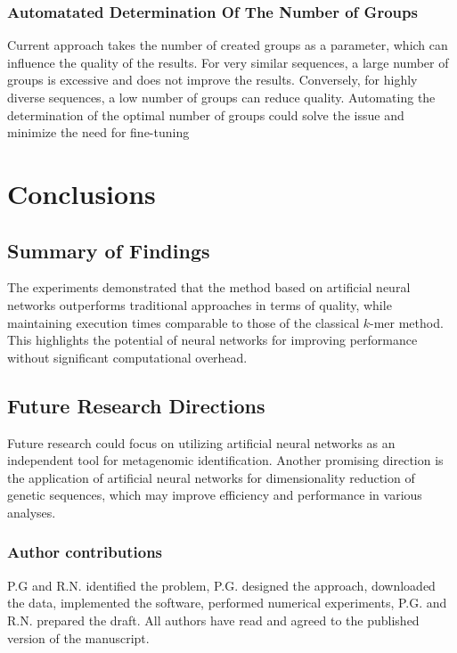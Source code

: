 \documentclass[pdflatex,sn-vancouver-num]{sn-jnl}%
\begin{document}
            \subsubsection{Automatated Determination Of The Number of Groups}
                Current approach takes the number of created groups as a parameter, which can influence the quality of the results. For very similar sequences, a large number of groups is excessive and does not improve the results. Conversely, for highly diverse sequences, a low number of groups can reduce quality. Automating the determination of the optimal number of groups could solve the issue and minimize the need for fine-tuning 

    \section{Conclusions}
        \subsection{Summary of Findings}
            The experiments demonstrated that the method based on artificial neural networks outperforms traditional approaches in terms of quality, while maintaining execution times comparable to those of the classical $k$-mer method. This highlights the potential of neural networks for improving performance without significant computational overhead.

        \subsection{Future Research Directions}
        Future research could focus on utilizing artificial neural networks as an independent tool for metagenomic identification. Another promising direction is the application of artificial neural networks for dimensionality reduction of genetic sequences, which may improve efficiency and performance in various analyses.


\subsubsection*{Author contributions}

P.G and R.N. identified the problem, P.G. designed the approach, downloaded the data, implemented the software, performed numerical experiments, P.G. and R.N. prepared the draft. All authors have read and agreed to the published version of the manuscript.
\end{document}
